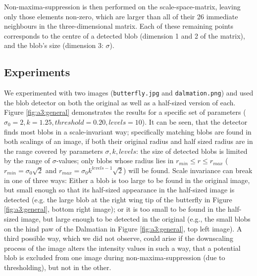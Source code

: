 Non-maxima-suppression is then performed on the scale-space-matrix, leaving only those elements non-zero, which are larger than all of their 26 immediate neighbours in the three-dimensional matrix. Each of these remaining points corresponds to the centre of a detected blob (dimension 1 and 2 of the matrix), and the blob's size (dimension 3: $\sigma$).

\subsection{Experiments}

We experimented with two images (\texttt{butterfly.jpg} and \texttt{dalmation.png}) and used the blob detector on both the original as well as a half-sized version of each. Figure \ref{fig:a3:general} demonstrates the results for a specific set of parameters ($\sigma_0=2, k=1.25, threshold=0.20, levels=10$). It can be seen, that the detector finds most blobs in a scale-invariant way; specifically matching blobs are found in both scalings of an image, if both their original radius and half sized radius are in the range covered by parameters $\sigma, k, levels$: the size of detected blobs is limited by the range of $\sigma$-values; only blobs whose radius lies in $r_{min} \leq r \leq r_{max}$ ($r_{min} = \sigma_0 \sqrt{2}$ and $r_{max} = \sigma_0 k^{levels-1}  \sqrt{2}$) will be found. Scale invariance can break in one of three ways: Either a blob is too large to be found in the original image, but small enough so that its half-sized appearance in the half-sized image is detected (e.g. the large blob at the right wing tip of the butterfly in Figure \ref{fig:a3:general}, bottom right image); or it is too small to be found in the half-sized image, but large enough to be detected in the original (e.g., the small blobs on the hind paw of the Dalmatian in Figure \ref{fig:a3:general}, top left image). A third possible way, which we did not observe, could arise if the downscaling process of the image alters the intensity values in such a way, that a potential blob is excluded from one image during non-maxima-suppression (due to thresholding), but not in the other.

